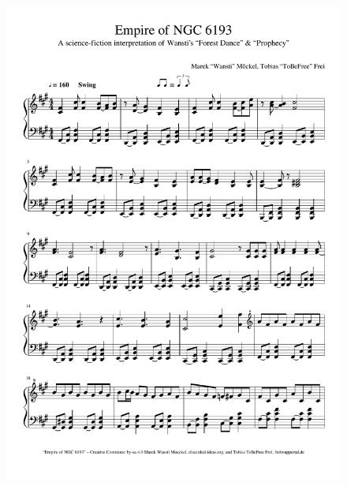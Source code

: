 \begin{figure}[p]
    \includegraphics[width=\textwidth, page=2]{z-include-ia3theme.pdf}
\end{figure}

